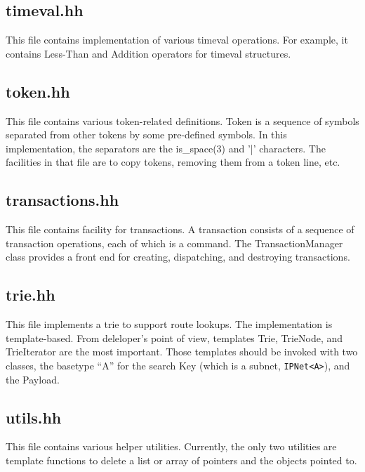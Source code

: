 \documentclass[11pt]{article}
\begin{document}
\subsection{timeval.hh}

This file contains implementation of various timeval operations.
For example, it contains Less-Than and Addition operators for timeval
structures.


\subsection{token.hh}

This file contains various token-related definitions. Token is a
sequence of symbols separated from other tokens by some pre-defined
symbols. In this implementation, the separators are the is\_space(3) and
'|' characters.
The facilities in that file are to copy tokens, removing them from a
token line, etc.

\subsection{transactions.hh}

This file contains facility for transactions.  A transaction consists
of a sequence of transaction operations, each of which is a command.
The TransactionManager class provides a front end for creating,
dispatching, and destroying transactions.

\subsection{trie.hh}

This file implements a trie to support route lookups.
The implementation is template-based. From deleloper's point
of view, templates Trie, TrieNode, and TrieIterator
are the most important. Those templates should be invoked with two
classes, the basetype ``A'' for the search Key (which is a subnet,
\verb=IPNet<A>=), and the Payload.


\subsection{utils.hh}

This file contains various helper utilities. Currently, the only two
utilities are template functions to delete a list or array
of pointers and the objects pointed to. 
\end{document}
